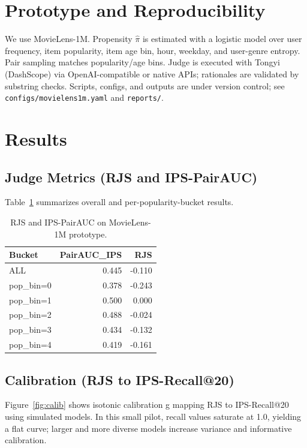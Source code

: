 \documentclass[10pt]{article}
\begin{document}
\section{Prototype and Reproducibility}
We use MovieLens-1M. Propensity \(\hat{\pi}\) is estimated with a logistic model over user frequency, item popularity, item age bin, hour, weekday, and user-genre entropy. Pair sampling matches popularity/age bins. Judge is executed with Tongyi (DashScope) via OpenAI-compatible or native APIs; rationales are validated by substring checks. Scripts, configs, and outputs are under version control; see \texttt{configs/movielens1m.yaml} and \texttt{reports/}.

\section{Results}

\subsection{Judge Metrics (RJS and IPS-PairAUC)}
Table~\ref{tab:rjs} summarizes overall and per-popularity-bucket results.

\begin{table}[h]
\centering
\begin{tabular}{lrr}
\toprule
Bucket & PairAUC\_IPS & RJS\\
\midrule
ALL & 0.445 & -0.110 \\
pop\_bin=0 & 0.378 & -0.243 \\
pop\_bin=1 & 0.500 & 0.000 \\
pop\_bin=2 & 0.488 & -0.024 \\
pop\_bin=3 & 0.434 & -0.132 \\
pop\_bin=4 & 0.419 & -0.161 \\
\bottomrule
\end{tabular}
\caption{RJS and IPS-PairAUC on MovieLens-1M prototype.}
\label{tab:rjs}
\end{table}

\subsection{Calibration (RJS to IPS-Recall@20)}
Figure~\ref{fig:calib} shows isotonic calibration g mapping RJS to IPS-Recall@20 using simulated models. In this small pilot, recall values saturate at 1.0, yielding a flat curve; larger and more diverse models increase variance and informative calibration.
\end{document}
